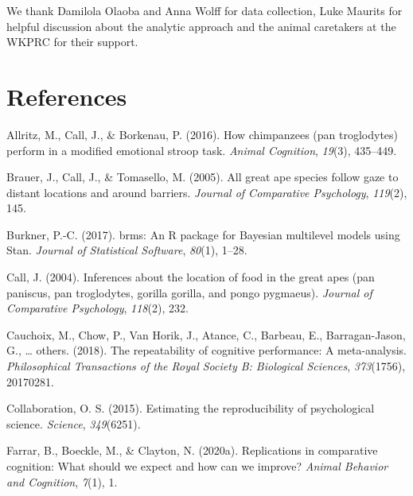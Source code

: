 \documentclass[10pt, letterpaper]{article}
\begin{document}
We thank Damilola Olaoba and Anna Wolff for data collection, Luke
Maurits for helpful discussion about the analytic approach and the
animal caretakers at the WKPRC for their support.

\hypertarget{references}{%
\section{References}\label{references}}

\setlength{\parindent}{-0.1in} 
\setlength{\leftskip}{0.125in}

\noindent

\hypertarget{refs}{}
\leavevmode\hypertarget{ref-allritz2016chimpanzees}{}%
Allritz, M., Call, J., \& Borkenau, P. (2016). How chimpanzees (pan
troglodytes) perform in a modified emotional stroop task. \emph{Animal
Cognition}, \emph{19}(3), 435--449.

\leavevmode\hypertarget{ref-brauer2005all}{}%
Brauer, J., Call, J., \& Tomasello, M. (2005). All great ape species
follow gaze to distant locations and around barriers. \emph{Journal of
Comparative Psychology}, \emph{119}(2), 145.

\leavevmode\hypertarget{ref-R-brms_a}{}%
Burkner, P.-C. (2017). brms: An R package for Bayesian multilevel models
using Stan. \emph{Journal of Statistical Software}, \emph{80}(1), 1--28.

\leavevmode\hypertarget{ref-call2004inferences}{}%
Call, J. (2004). Inferences about the location of food in the great apes
(pan paniscus, pan troglodytes, gorilla gorilla, and pongo pygmaeus).
\emph{Journal of Comparative Psychology}, \emph{118}(2), 232.

\leavevmode\hypertarget{ref-cauchoix2018repeatability}{}%
Cauchoix, M., Chow, P., Van Horik, J., Atance, C., Barbeau, E.,
Barragan-Jason, G., \ldots{} others. (2018). The repeatability of
cognitive performance: A meta-analysis. \emph{Philosophical Transactions
of the Royal Society B: Biological Sciences}, \emph{373}(1756),
20170281.

\leavevmode\hypertarget{ref-open2015estimating}{}%
Collaboration, O. S. (2015). Estimating the reproducibility of
psychological science. \emph{Science}, \emph{349}(6251).

\leavevmode\hypertarget{ref-farrar2020replicomp}{}%
Farrar, B., Boeckle, M., \& Clayton, N. (2020a). Replications in
comparative cognition: What should we expect and how can we improve?
\emph{Animal Behavior and Cognition}, \emph{7}(1), 1.
\end{document}
